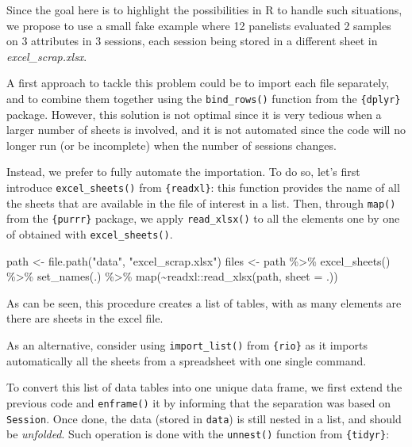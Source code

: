\documentclass[
]{krantz}
\makeatletter
\newenvironment{Shaded}{\begin{snugshade}}{\end{snugshade}}
\newcommand{\AttributeTok}[1]{\textcolor[rgb]{0.61,0.61,0.61}{#1}}
\newcommand{\FunctionTok}[1]{\textcolor[rgb]{0,0,0}{#1}}
\newcommand{\NormalTok}[1]{#1}
\newcommand{\OtherTok}[1]{\textcolor[rgb]{0.37,0.37,0.37}{#1}}
\newcommand{\SpecialCharTok}[1]{\textcolor[rgb]{0,0,0}{#1}}
\newcommand{\StringTok}[1]{\textcolor[rgb]{0.5,0.5,0.5}{#1}}
\renewenvironment{quote}{\begin{VF}}{\end{VF}}
\newenvironment{kframe}{%
\medskip{}
\setlength{\fboxsep}{.8em}
 \def\at@end@of@kframe{}%
 \ifinner\ifhmode%
  \def\at@end@of@kframe{\end{minipage}}%
  \begin{minipage}{\columnwidth}%
 \fi\fi%
 \def\FrameCommand##1{\hskip\@totalleftmargin \hskip-\fboxsep
 \colorbox{shadecolor}{##1}\hskip-\fboxsep
     \hskip-\linewidth \hskip-\@totalleftmargin \hskip\columnwidth}%
 \MakeFramed {\advance\hsize-\width
   \@totalleftmargin\z@ \linewidth\hsize
   \@setminipage}}%
 {\par\unskip\endMakeFramed%
 \at@end@of@kframe}
\renewenvironment{Shaded}{\begin{kframe}}{\end{kframe}}
\makeatother
\begin{document}
Since the goal here is to highlight the possibilities in R to handle such situations, we propose to use a small fake example where 12 panelists evaluated 2 samples on 3 attributes in 3 sessions, each session being stored in a different sheet in \emph{excel\_scrap.xlsx}.

A first approach to tackle this problem could be to import each file separately, and to combine them together using the \texttt{bind\_rows()} function from the \texttt{\{dplyr\}} package. However, this solution is not optimal since it is very tedious when a larger number of sheets is involved, and it is not automated since the code will no longer run (or be incomplete) when the number of sessions changes.

Instead, we prefer to fully automate the importation. To do so, let's first introduce \texttt{excel\_sheets()} from \texttt{\{readxl\}}: this function provides the name of all the sheets that are available in the file of interest in a list. Then, through \texttt{map()} from the \texttt{\{purrr\}} package, we apply \texttt{read\_xlsx()} to all the elements one by one of obtained with \texttt{excel\_sheets()}.

\begin{Shaded}
\begin{Highlighting}[]
\NormalTok{path }\OtherTok{\textless{}{-}} \FunctionTok{file.path}\NormalTok{(}\StringTok{"data"}\NormalTok{, }\StringTok{"excel\_scrap.xlsx"}\NormalTok{)}
\NormalTok{files }\OtherTok{\textless{}{-}}\NormalTok{ path }\SpecialCharTok{\%\textgreater{}\%} 
  \FunctionTok{excel\_sheets}\NormalTok{() }\SpecialCharTok{\%\textgreater{}\%} 
  \FunctionTok{set\_names}\NormalTok{(.) }\SpecialCharTok{\%\textgreater{}\%} 
  \FunctionTok{map}\NormalTok{(}\SpecialCharTok{\textasciitilde{}}\NormalTok{readxl}\SpecialCharTok{::}\FunctionTok{read\_xlsx}\NormalTok{(path, }\AttributeTok{sheet =}\NormalTok{ .))}
\end{Highlighting}
\end{Shaded}

As can be seen, this procedure creates a list of tables, with as many elements are there are sheets in the excel file.

\begin{quote}
As an alternative, consider using \texttt{import\_list()} from \texttt{\{rio\}} as it imports automatically all the sheets from a spreadsheet with one single command.
\end{quote}

To convert this list of data tables into one unique data frame, we first extend the previous code and \texttt{enframe()} it by informing that the separation was based on \texttt{Session}. Once done, the data (stored in \texttt{data}) is still nested in a list, and should be \emph{unfolded}. Such operation is done with the \texttt{unnest()} function from \texttt{\{tidyr\}}:
\end{document}
